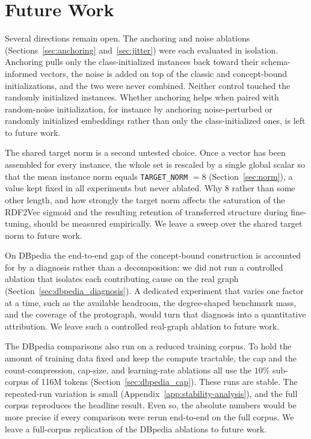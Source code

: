 \documentclass[a4paper,oneside,bibliography=totoc]{scrbook}
\begin{document}
\section{Future Work}
\label{sec:future_work}

Several directions remain open. The anchoring and noise ablations
(Sections~\ref{sec:anchoring} and~\ref{sec:jitter}) were each evaluated in
isolation. Anchoring pulls only the class-initialized instances back toward
their schema-informed vectors, the noise is added on top of the classic and
concept-bound initializations, and the two were never combined. Neither control
touched the randomly initialized instances. Whether anchoring helps when paired
with random-noise initialization, for instance by anchoring noise-perturbed or
randomly initialized embeddings rather than only the class-initialized ones, is
left to future work.

The shared target norm is a second untested choice. Once a vector has been
assembled for every instance, the whole set is rescaled by a single global
scalar so that the mean instance norm equals \texttt{TARGET\_NORM} $= 8$
(Section~\ref{sec:norm}), a value kept fixed in all experiments but never
ablated. Why $8$ rather than some other length, and how strongly the target
norm affects the saturation of the RDF2Vec sigmoid and the resulting retention
of transferred structure during fine-tuning, should be measured empirically. We
leave a sweep over the shared target norm to future work.

On DBpedia the end-to-end gap of the concept-bound construction is accounted for
by a diagnosis rather than a decomposition: we did not run a controlled ablation
that isolates each contributing cause on the real graph
(Section~\ref{sec:dbpedia_diagnosis}). A dedicated experiment that varies one
factor at a time, such as the available headroom, the degree-shaped benchmark
mass, and the coverage of the protograph, would turn that diagnosis into a
quantitative attribution. We leave such a controlled real-graph ablation to
future work.

The DBpedia comparisons also run on a reduced training corpus. To hold the
amount of training data fixed and keep the compute tractable, the cap and the
count-compression, cap-size, and learning-rate ablations all use the $10\%$
sub-corpus of 116M tokens (Section~\ref{sec:dbpedia_cap}). These runs are stable.
The repeated-run variation is small (Appendix~\ref{app:stability-analysis}), and
the full corpus reproduces the headline result. Even so, the absolute numbers
would be more precise if every comparison were rerun end-to-end on the full
corpus. We leave a full-corpus replication of the DBpedia ablations to future
work.
\end{document}
